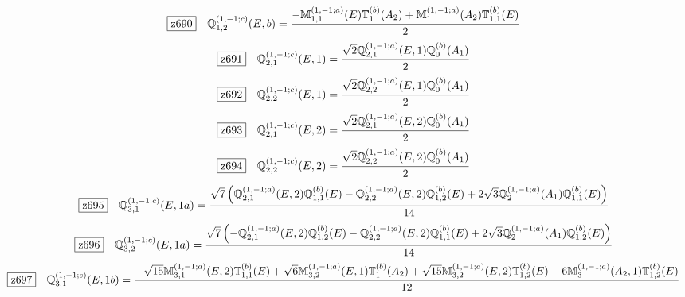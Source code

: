\documentclass[fleqn,10pt,landscape]{jsarticle}
\begin{document}
\begin{dmath*}
\hspace*{3mm}\fbox{z690}\quad \mathbb{Q}_{1,2}^{(1,-1;c)}(E,b)=\frac{- \mathbb{M}_{1,1}^{(1,-1;a)}(E) \mathbb{T}_{1}^{(b)}(A_{2}) + \mathbb{M}_{1}^{(1,-1;a)}(A_{2}) \mathbb{T}_{1,1}^{(b)}(E)}{2}
\end{dmath*}
\begin{dmath*}
\hspace*{3mm}\fbox{z691}\quad \mathbb{Q}_{2,1}^{(1,-1;c)}(E,1)=\frac{\sqrt{2} \mathbb{Q}_{2,1}^{(1,-1;a)}(E,1) \mathbb{Q}_{0}^{(b)}(A_{1})}{2}
\end{dmath*}
\begin{dmath*}
\hspace*{3mm}\fbox{z692}\quad \mathbb{Q}_{2,2}^{(1,-1;c)}(E,1)=\frac{\sqrt{2} \mathbb{Q}_{2,2}^{(1,-1;a)}(E,1) \mathbb{Q}_{0}^{(b)}(A_{1})}{2}
\end{dmath*}
\begin{dmath*}
\hspace*{3mm}\fbox{z693}\quad \mathbb{Q}_{2,1}^{(1,-1;c)}(E,2)=\frac{\sqrt{2} \mathbb{Q}_{2,1}^{(1,-1;a)}(E,2) \mathbb{Q}_{0}^{(b)}(A_{1})}{2}
\end{dmath*}
\begin{dmath*}
\hspace*{3mm}\fbox{z694}\quad \mathbb{Q}_{2,2}^{(1,-1;c)}(E,2)=\frac{\sqrt{2} \mathbb{Q}_{2,2}^{(1,-1;a)}(E,2) \mathbb{Q}_{0}^{(b)}(A_{1})}{2}
\end{dmath*}
\begin{dmath*}
\hspace*{3mm}\fbox{z695}\quad \mathbb{Q}_{3,1}^{(1,-1;c)}(E,1a)=\frac{\sqrt{7} \left(\mathbb{Q}_{2,1}^{(1,-1;a)}(E,2) \mathbb{Q}_{1,1}^{(b)}(E) - \mathbb{Q}_{2,2}^{(1,-1;a)}(E,2) \mathbb{Q}_{1,2}^{(b)}(E) + 2 \sqrt{3} \mathbb{Q}_{2}^{(1,-1;a)}(A_{1}) \mathbb{Q}_{1,1}^{(b)}(E)\right)}{14}
\end{dmath*}
\begin{dmath*}
\hspace*{3mm}\fbox{z696}\quad \mathbb{Q}_{3,2}^{(1,-1;c)}(E,1a)=\frac{\sqrt{7} \left(- \mathbb{Q}_{2,1}^{(1,-1;a)}(E,2) \mathbb{Q}_{1,2}^{(b)}(E) - \mathbb{Q}_{2,2}^{(1,-1;a)}(E,2) \mathbb{Q}_{1,1}^{(b)}(E) + 2 \sqrt{3} \mathbb{Q}_{2}^{(1,-1;a)}(A_{1}) \mathbb{Q}_{1,2}^{(b)}(E)\right)}{14}
\end{dmath*}
\begin{dmath*}
\hspace*{3mm}\fbox{z697}\quad \mathbb{Q}_{3,1}^{(1,-1;c)}(E,1b)=\frac{- \sqrt{15} \mathbb{M}_{3,1}^{(1,-1;a)}(E,2) \mathbb{T}_{1,1}^{(b)}(E) + \sqrt{6} \mathbb{M}_{3,2}^{(1,-1;a)}(E,1) \mathbb{T}_{1}^{(b)}(A_{2}) + \sqrt{15} \mathbb{M}_{3,2}^{(1,-1;a)}(E,2) \mathbb{T}_{1,2}^{(b)}(E) - 6 \mathbb{M}_{3}^{(1,-1;a)}(A_{2},1) \mathbb{T}_{1,2}^{(b)}(E)}{12}
\end{dmath*}
\end{document}

